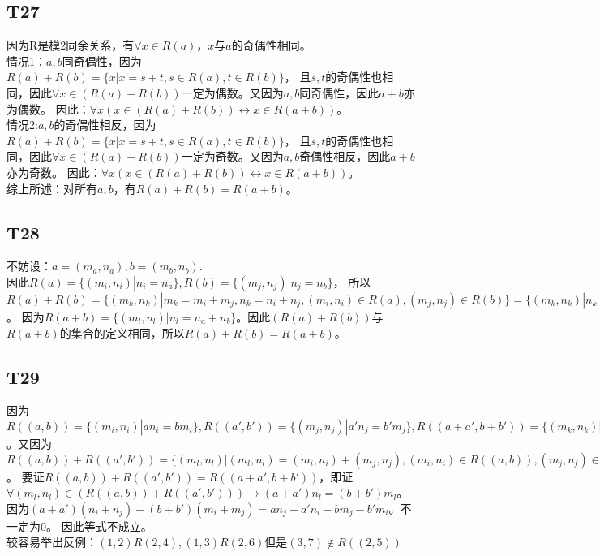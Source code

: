 \documentclass{article}
\begin{document}
\subsection{T27}
因为R是模2同余关系，有$\forall x \in R(a)$，$x$与$a$的奇偶性相同。\\
情况1：$a, b$同奇偶性，因为$R(a) + R(b) = \{x | x = s + t, s \in R(a), t \in R(b)\}$，
且$s, t$的奇偶性也相同，因此$\forall x \in (R(a) + R(b))$一定为偶数。又因为$a, b$同奇偶性，因此$a + b$亦为偶数。
因此：$\forall x(x \in (R(a) + R(b)) \leftrightarrow x \in R(a + b))$。\\
情况2:$a, b$的奇偶性相反，因为$R(a) + R(b) = \{x | x = s + t, s \in R(a), t \in R(b)\}$，
且$s, t$的奇偶性也相同，因此$\forall x \in (R(a) + R(b))$一定为奇数。又因为$a, b$奇偶性相反，因此$a + b$亦为奇数。
因此：$\forall x(x \in (R(a) + R(b)) \leftrightarrow x \in R(a + b))$。\\
综上所述：对所有$a, b$，有$R(a) + R(b) = R(a + b)$。
\subsection{T28}
不妨设：$a = (m_a, n_a), b = (m_b, n_b)$.\\
因此$R(a) = \{(m_i, n_i) | n_i = n_a\}, R(b) = \{(m_j, n_j) | n_j = n_b\}$，
所以$R(a) + R(b) = \{(m_k, n_k) | m_k = m_i + m_j, n_k = n_i + n_j, (m_i, n_i) \in R(a), (m_j, n_j) \in R(b)\}
= \{(m_k, n_k) | n_k = n_a + n_b\}$。
因为$R(a + b) = \{(m_l, n_l) | n_l = n_a + n_b\}$。因此$(R(a) + R(b))$与$R(a+b)$的集合的定义相同，所以$R(a) + R(b) = R(a + b)$。
\subsection{T29}
因为$R((a, b)) = \{(m_i, n_i) | an_i = bm_i\}, R((a', b')) = \{(m_j, n_j) | a'n_j = b'm_j\},
R((a + a', b + b')) = \{(m_k, n_k) | (a + a')n_k = (b + b')m_k\}$。又因为$R((a, b)) + R((a', b'))
= \{(m_l, n_l) | (m_l, n_l) = (m_i, n_i) + (m_j, n_j), (m_i, n_i) \in R((a, b)), (m_j, n_j) \in R((a', b'))\}$。
要证$R((a, b)) + R((a', b')) = R((a + a', b + b'))$，即证$\forall (m_l, n_l) \in (R((a, b)) + R((a', b'))) \rightarrow
(a + a')n_l = (b + b')m_l$。因为$(a + a')(n_i + n_j) - (b + b')(m_i + m_j) = an_j + a'n_i - bm_j - b'm_i$。不一定为0。
因此等式不成立。\\
较容易举出反例：$(1, 2) R (2, 4), (1, 3) R (2, 6)$但是$(3, 7) \notin R((2, 5))$
\end{document}
